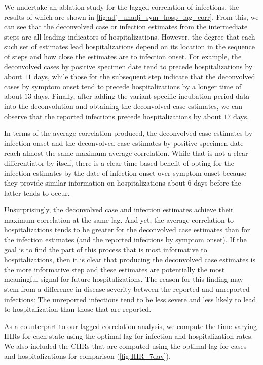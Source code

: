 \documentclass{article}
\begin{document}
We undertake an ablation study for the lagged correlation of infections, the results of which 
are shown in \autoref{fig:adj_unadj_sym_hosp_lag_corr}. From this, we can see that the 
deconvolved case or infection estimates from the intermediate 
steps are all leading indicators of hospitalizations. However, the degree that each such set of estimates
lead hospitalizations depend on its location in the sequence of steps and how close the estimates 
are to infection onset. For example, the deconvolved cases by positive specimen date
tend to precede hospitalizations by about $11$ days, 
while those for the subsequent step indicate that the deconvolved cases by symptom onset tend to 
precede hospitalizations by a longer time of about $13$ days. Finally, after adding the variant-specific 
incubation period data into the deconvolution and obtaining the deconvolved case estimates, 
we can observe that the reported infections precede
hospitalizations by about $17$ days. 

In terms of the average correlation produced, the deconvolved case estimates by infection onset and the
deconvolved case estimates by positive specimen date reach almost the same maximum average correlation.
While that is not a clear differentiator by itself, there is a clear time-based benefit of opting for
the infection estimates by the date of infection onset over symptom onset because they provide similar information 
on hospitalizations about $6$ days before the latter tends to occur.

Unsurprisingly, the deconvolved case and infection estimates achieve their maximum correlation
at the same lag. And yet, the average correlation to hospitalizations
tends to be greater for the deconvolved case estimates than for the infection estimates (and
the reported infections by symptom onset). If the goal is to find the part of this process that is most informative to
 hospitalizations, then it is clear that producing the deconvolved case estimates is the more informative step
and these estimates are potentially the most meaningful signal for future hospitalizations.
The reason for this finding may stem from a difference in disease severity between the reported and unreported infections: 
The unreported infections tend to be less severe and less likely to lead to hospitalization than those that are reported.

As a counterpart to our lagged correlation analysis, we compute the time-varying IHRs 
for each state using the optimal lag for infection and hospitalization rates. We also included
the CHRs that are computed using the optimal lag for cases and hospitalizations for comparison
(\autoref{fig:IHR_7dav}). 
\end{document}
